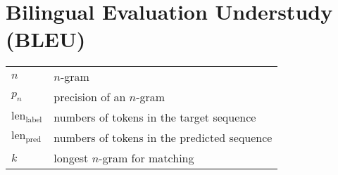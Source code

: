 \section{Bilingual Evaluation Understudy (BLEU) \cite{dnn-1}} \label{Bilingual Evaluation Understudy (BLEU)}


\begin{customTableWrapper}{1.5}
\begin{longtable}{l p{8cm}}

    $n$ & $n$-gram \\

    $p_n$ & precision of an $n$-gram \\

    $\textrm{len}_{\textrm{label}}$ & numbers of tokens in the target sequence \\

    $\textrm{len}_{\textrm{pred}}$ & numbers of tokens in the predicted sequence \\

    $k$ & longest $n$-gram for matching \\

\end{longtable}
\end{customTableWrapper}


